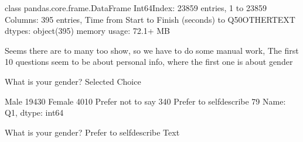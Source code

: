 \documentclass[letterpaper,10pt,english]{jupyterBook}
\begin{document}
\begin{sphinxVerbatim}[commandchars=\\\{\}]
\end{sphinxVerbatim}

\begin{sphinxVerbatim}[commandchars=\\\{\}]
\PYGZlt{}class \PYGZsq{}pandas.core.frame.DataFrame\PYGZsq{}\PYGZgt{}
Int64Index: 23859 entries, 1 to 23859
Columns: 395 entries, Time from Start to Finish (seconds) to Q50\PYGZus{}OTHER\PYGZus{}TEXT
dtypes: object(395)
memory usage: 72.1+ MB
\end{sphinxVerbatim}

\sphinxAtStartPar
Seems there are to many too show, so we have to do some manual work, The first 10 questions seem to be about personal info, where the first one is about gender

\begin{sphinxVerbatim}[commandchars=\\\{\}]
\end{sphinxVerbatim}

\begin{sphinxVerbatim}[commandchars=\\\{\}]
What is your gender? \PYGZhy{} Selected Choice
\end{sphinxVerbatim}

\begin{sphinxVerbatim}[commandchars=\\\{\}]
Male                       19430
Female                      4010
Prefer not to say            340
Prefer to self\PYGZhy{}describe       79
Name: Q1, dtype: int64
\end{sphinxVerbatim}

\begin{sphinxVerbatim}[commandchars=\\\{\}]
\end{sphinxVerbatim}

\begin{sphinxVerbatim}[commandchars=\\\{\}]
What is your gender? \PYGZhy{} Prefer to self\PYGZhy{}describe \PYGZhy{} Text
\end{sphinxVerbatim}
\end{document}
